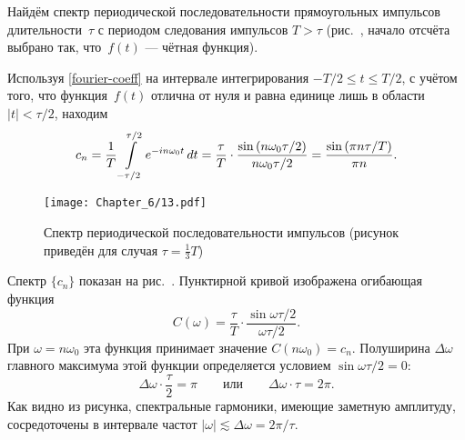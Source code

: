 \begin{lab:example}\label{example:square-zug}
Найдём спектр периодической последовательности прямоугольных
импульсов длительности~$\tau$ с периодом следования импульсов $T>\tau$
(рис.~, начало отсчёта выбрано так, что~$f(t)$ --- чётная
функция).

Используя \eqref{fourier-coeff} на интервале интегрирования
$-T/2\le t \le T/2$, с учётом того, что функция~$f(t)$ отлична от нуля и
равна единице лишь в области $|t|<\tau/2$, находим
\begin{equation}
    \eqmark{impulses-spectrum}
    c_n =\frac{1}{T}\int\limits_{-\tau/2}^{\tau/2} e^{-in\omega_0 t}\,dt
    =\frac{\tau}{T}\cdot \frac{\sin \left(n\omega_0\tau/2\right)}{n\omega_0\tau/2} =
     \frac{\sin \left(\pi n \tau/T\right)}{\pi n}.
\end{equation}

\begin{figure}[h!]
    \centering
    \texttt{[image: Chapter\_6/13.pdf]}
    \caption{Спектр периодической последовательности импульсов
        (рисунок приведён для случая $\tau=\frac13 T$)}
\end{figure}

Спектр $\{c_n\}$ показан на рис.~.
Пунктирной кривой изображена огибающая функция
\begin{equation*}
    C(\omega) =\frac{\tau}{T}\cdot \frac{\sin\omega\tau/2}{\omega\tau/2}.
\end{equation*}
При $\omega=n\omega_0$ эта функция принимает значение $C(n\omega_0)=c_n$.
Полуширина $\Delta \omega$ главного максимума этой функции определяется
условием $\sin\omega\tau/2=0$:
\begin{equation*}
    \Delta\omega \cdot \frac{\tau}{2}=\pi\qquad \text{или} \qquad \Delta \omega
\cdot \tau =2\pi.
\end{equation*}
Как видно из рисунка, спектральные гармоники,
имеющие заметную амплитуду, сосредоточены в интервале частот
$|\omega|\lesssim\Delta\omega=2\pi/\tau$.
\end{lab:example}




